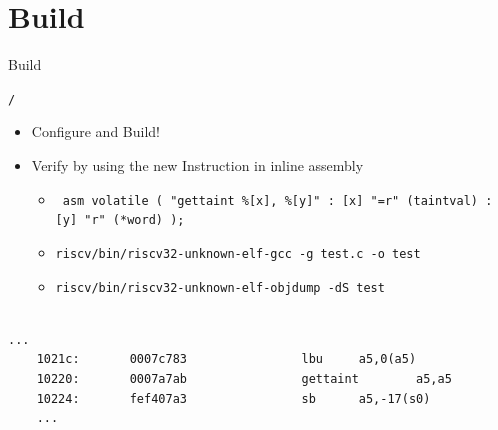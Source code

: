 \documentclass[aspectratio=169]{CPS-Beamer}
\begin{document}
\section{Build}
\begin{frame}[fragile]{Build}
	\begin{block}{\texttt{/}}
		\begin{itemize}
			\item Configure and Build!
			\item Verify by using the new Instruction in inline assembly
			\begin{itemize}
				\item \texttt{\footnotesize%
asm volatile
(
	"gettaint  \%[x], \%[y]" %
	: [x] "=r" (taintval) %
	: [y] "r" (*word) %
);}
				\item \texttt{riscv/bin/riscv32-unknown-elf-gcc -g test.c -o test}
				\item \texttt{riscv/bin/riscv32-unknown-elf-objdump -dS test} \\~\\
			\end{itemize}
		\end{itemize}
\begin{Verbatim}[fontsize=\small]
	...
	1021c:       0007c783                lbu     a5,0(a5)
	10220:       0007a7ab                gettaint        a5,a5
	10224:       fef407a3                sb      a5,-17(s0)
	...
\end{Verbatim}
	
	\end{block}
\end{frame}
\end{document}
